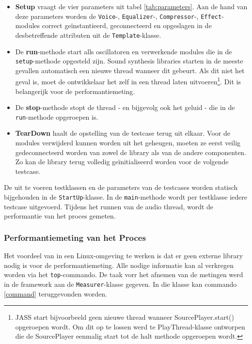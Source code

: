 \begin{itemize}
	\item \textbf{Setup} vraagt de vier parameters uit tabel \ref{tab:parameters}. Aan de hand van deze parameters worden de \verb+Voice+-, \verb+Equalizer+-, \verb+Compressor+-, \verb+Effect+-modules correct geïnstantieerd, geconnecteerd en opgeslagen in de desbetreffende attributen uit de \verb+Template+-klasse.
	\item De \textbf{run}-methode start alls oscillatoren en verwerkende modules die in de \verb+setup+-methode opgesteld zijn. Sound synthesis libraries starten in de meeste gevallen automatisch een nieuwe thread wanneer dit gebeurt. Als dit niet het geval is, moet de ontwikkelaar het zelf in een thread laten uitvoeren\footnote{JASS start bijvoorbeeld geen nieuwe thread wanneer SourcePlayer.start() opgeroepen wordt. Om dit op te lossen werd te PlayThread-klasse ontworpen die de SourcePlayer eenmalig start tot de halt methode opgeroepen wordt.}. Dit is belangerijk voor de performantiemeting. 
	\item De \textbf{stop}-methode stopt de thread - en bijgevolg ook het geluid - die in de \verb+run+-methode opgeroepen is.
	\item \textbf{TearDown} haalt de opstelling van de testcase terug uit elkaar. Voor de modules verwijderd kunnen worden uit het geheugen, moeten ze eerst veilig gedeconnecteerd worden van zowel de library als van de andere componenten. Zo kan de library terug volledig geïnitialiseerd worden voor de volgende testcase.
\end{itemize}

De uit te voeren testklassen en de parameters van de testcases worden statisch bijgehouden in de \verb+StartUp+-klasse. In de \verb+main+-methode wordt per testklasse iedere testcase uitgevoerd. Tijdens het runnen van de audio thread, wordt de performantie van het proces gemeten.

\subsubsection{Performantiemeting van het Proces}

Het voordeel van in een Linux-omgeving te werken is dat er geen externe library nodig is voor de performantiemeting. Alle nodige informatie kan al verkregen worden via het \verb+top+-commando. De taak vorr het afnemen van de metingen werd in de framework aan de \verb+Measurer+-klasse gegeven. In die klasse kan commando \ref{command} teruggevonden worden.

